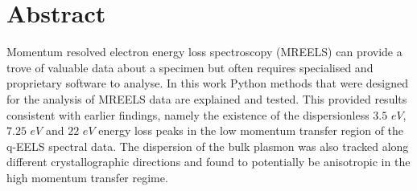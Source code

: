 \section*{Abstract}
%
Momentum resolved electron energy loss spectroscopy (MREELS) can provide a trove of valuable data about a specimen but often requires specialised and proprietary software to analyse. In this work Python methods that were designed for the analysis of MREELS data are explained and tested. This provided results consistent with earlier findings, namely the existence of the dispersionless $3.5$ $eV$, $7.25$ $eV$ and $22$ $eV$ energy loss peaks in the low momentum transfer region of the q-EELS spectral data. The dispersion of the bulk plasmon was also tracked along different crystallographic directions and found to potentially be anisotropic in the high momentum transfer regime.